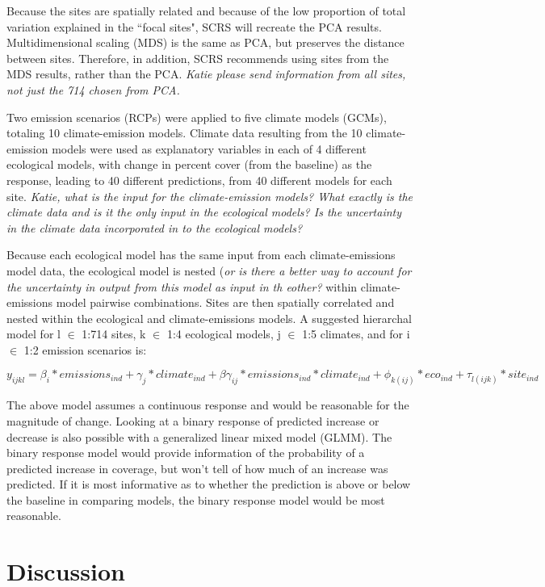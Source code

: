 \documentclass[11pt]{cscrs_notes} %
\begin{document}
Because the sites are spatially related and because of the low proportion of total variation explained in the ``focal sites", SCRS will recreate the PCA results. Multidimensional scaling (MDS) is the same as PCA, but preserves the distance between sites. Therefore, in addition, SCRS recommends using sites from the MDS results, rather than the PCA. {\it Katie please send information from all sites, not just the 714 chosen from PCA.}

Two emission scenarios (RCPs) were applied to five climate models (GCMs), totaling 10 climate-emission models. Climate data resulting from the 10 climate-emission models were used as explanatory variables in each of 4 different ecological models, with change in percent cover (from the baseline) as the response, leading to 40 different predictions, from 40 different models for each site. {\it Katie, what is the input for the climate-emission models? What exactly is the climate data and is it the only input in the ecological models? Is the uncertainty in the climate data incorporated in to the ecological models?}

Because each ecological model has the same input from each climate-emissions model data, the ecological model is nested ({\it or is there a better way to account for the uncertainty in output from this model as input in th eother?} within climate-emissions model pairwise combinations. Sites are then spatially correlated and nested within the ecological and climate-emissions models. A suggested hierarchal model for l $\in$ 1:714 sites, k $\in$ 1:4 ecological models, j $\in$ 1:5 climates, and for i $\in$ 1:2 emission scenarios is:

$y_{ijkl} =  \beta_{i}*emissions_{ind} + \gamma_{j}*climate_{ind} + \beta\gamma_{ij}*emissions_{ind}*climate_{ind} + \phi_{k(ij)}*eco_{ind} + \tau_{l(ijk)}*site_{ind}$

The above model assumes a continuous response and would be reasonable for the magnitude of change. Looking at a binary response of predicted increase or decrease is also possible with a generalized linear mixed model (GLMM). The binary response model would provide information of the probability of a predicted increase in coverage, but won't tell of how much of an increase was predicted. If it is most informative as to whether the prediction is above or below the baseline in comparing models, the binary response model would be most reasonable. 

\section{Discussion}
\end{document}
